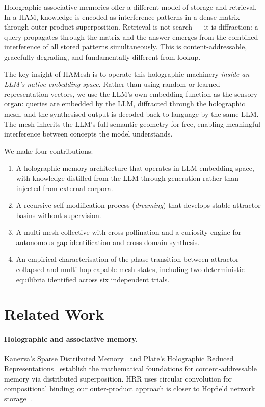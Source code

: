 \documentclass[11pt]{article}
\begin{document}
Holographic associative memories offer a different model of storage and
retrieval. In a HAM, knowledge is encoded as interference patterns in a dense
matrix through outer-product superposition. Retrieval is not search --- it is
diffraction: a query propagates through the matrix and the answer emerges from
the combined interference of all stored patterns simultaneously. This is
content-addressable, gracefully degrading, and fundamentally different from
lookup.

The key insight of HAMesh is to operate this holographic machinery \emph{inside
an LLM's native embedding space}. Rather than using random or learned
representation vectors, we use the LLM's own embedding function as the sensory
organ: queries are embedded by the LLM, diffracted through the holographic
mesh, and the synthesised output is decoded back to language by the same LLM.
The mesh inherits the LLM's full semantic geometry for free, enabling
meaningful interference between concepts the model understands.

We make four contributions:
\begin{enumerate}
  \item A holographic memory architecture that operates in LLM embedding space,
        with knowledge distilled from the LLM through generation rather than
        injected from external corpora.
  \item A recursive self-modification process (\emph{dreaming}) that develops
        stable attractor basins without supervision.
  \item A multi-mesh collective with cross-pollination and a curiosity engine
        for autonomous gap identification and cross-domain synthesis.
  \item An empirical characterisation of the phase transition between
        attractor-collapsed and multi-hop-capable mesh states, including two
        deterministic equilibria identified across six independent trials.
\end{enumerate}

\section{Related Work}

\paragraph{Holographic and associative memory.}
Kanerva's Sparse Distributed Memory~\cite{kanerva1988} and Plate's Holographic
Reduced Representations~\cite{plate1995} establish the mathematical foundations
for content-addressable memory via distributed superposition. HRR uses circular
convolution for compositional binding; our outer-product approach is closer to
Hopfield network storage~\cite{hopfield1982}.
\end{document}
